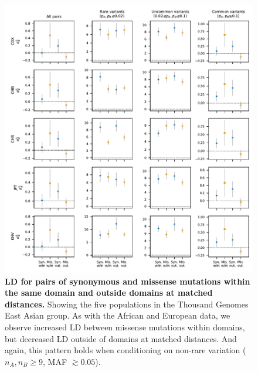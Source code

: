 \documentclass[]{article}
\begin{document}
\begin{figure}[ht!]
    \centering
    \includegraphics{../figures/data_domains_eas}
    \caption{
        \textbf{LD for pairs of synonymous and missense mutations within the
        same domain and outside domains at matched distances.}
        Showing the five populations in the Thousand Genomes East Asian group.
        As with the African and European data,
        we observe increased LD between missense mutations within domains,
        but decreased LD outside of domains at matched distances. And again,
        this pattern holds when conditioning on non-rare variation
        (\(n_A, n_B \geq 9\), MAF \(\gtrsim 0.05\)).
    }
    \label{fig:domainsEAS}
\end{figure}
\end{document}
